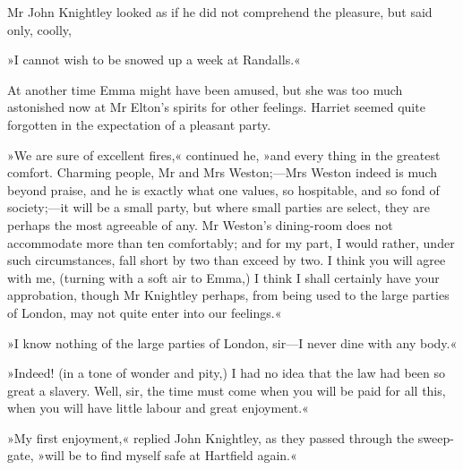 Mr John Knightley looked as if he did not comprehend the pleasure, but said only, coolly,

»I cannot wish to be snowed up a week at Randalls.«

At another time Emma might have been amused, but she was too much astonished now at Mr Elton's spirits for other feelings. Harriet seemed quite forgotten in the expectation of a pleasant party.

»We are sure of excellent fires,« continued he, »and every thing in the greatest comfort. Charming people, Mr and Mrs Weston;—Mrs Weston indeed is much beyond praise, and he is exactly what one values, so hospitable, and so fond of society;—it will be a small party, but where small parties are select, they are perhaps the most agreeable of any. Mr Weston's dining-room does not accommodate more than ten comfortably; and for my part, I would rather, under such circumstances, fall short by two than exceed by two. I think you will agree with me, (turning with a soft air to Emma,) I think I shall certainly have your approbation, though Mr Knightley perhaps, from being used to the large parties of London, may not quite enter into our feelings.«

»I know nothing of the large parties of London, sir—I never dine with any body.«

»Indeed! (in a tone of wonder and pity,) I had no idea that the law had been so great a slavery. Well, sir, the time must come when you will be paid for all this, when you will have little labour and great enjoyment.«

»My first enjoyment,« replied John Knightley, as they passed through the sweep-gate, »will be to find myself safe at Hartfield again.«
